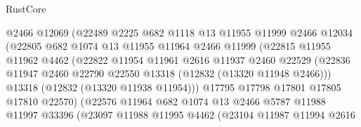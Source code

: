 \begin{lexlean}{RustCore}
\begin{coremodule}
                            @2466
                            @12069
                            (@22489
                              @2225
                              @682
                              @1118
                              @13
                              @11955
                              @11999
                              @2466
                              @12034
                              (@22805
                                @682
                                @1074
                                @13
                                @11955
                                @11964
                                @2466
                                @11999
                                (@22815
                                  @11955
                                  @11962
                                  @4462
                                  (@22822
                                    @11954
                                    @11961
                                    @2616
                                    @11937
                                    @2460
                                    @22529
                                    (@22836
                                      @11947
                                      @2460
                                      @22790
                                      @22550
                                      @13318
                                      (@12832 (@13320 @11948 @2466)))
                                    @13318
                                    (@12832 (@13320 @11938 @11954)))
                                  @17795
                                  @17798
                                  @17801
                                  @17805
                                  @17810
                                  @22570)
                                (@22576
                                  @11964
                                  @682
                                  @1074
                                  @13
                                  @2466
                                  @5787
                                  @11988
                                  @11997
                                  @33396
                                  (@23097
                                    @11988
                                    @11995
                                    @4462
                                    (@23104
                                      @11987
                                      @11994
                                      @2616

\end{coremodule}
\end{lexlean}

